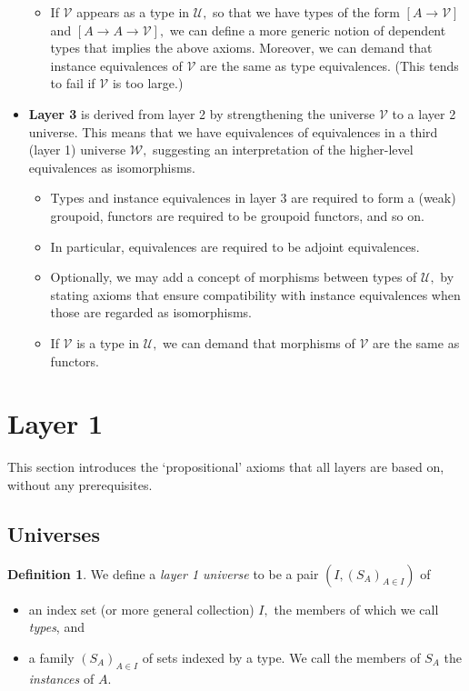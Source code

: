 \documentclass[a4paper]{article}
\theoremstyle{definition}
\newtheorem{definition}{Definition}[section]
\theoremstyle{remark}
\newcommand{\defn}{\emph}
\newcommand{\U}{\mathcal{U}}
\newcommand{\V}{\mathcal{V}}
\newcommand{\W}{\mathcal{W}}
\begin{document}
\begin{itemize}
\begin{itemize}
    \item If $\V$ appears as a type in $\U,$ so that we have types of the form $[A \to \V]$ and
    $[A \to A \to \V],$ we can define a more generic notion of dependent types that implies the
    above axioms. Moreover, we can demand that instance equivalences of $\V$ are the same as type
    equivalences. (This tends to fail if $\V$ is too large.)
  \end{itemize}
  \item \textbf{Layer 3} is derived from layer 2 by strengthening the universe $\V$ to a layer 2
  universe. This means that we have equivalences of equivalences in a third (layer 1) universe $\W,$
  suggesting an interpretation of the higher-level equivalences as isomorphisms.
  \begin{itemize}
    \item Types and instance equivalences in layer 3 are required to form a (weak) groupoid,
    functors are required to be groupoid functors, and so on.
    \item In particular, equivalences are required to be adjoint equivalences.
    \item Optionally, we may add a concept of morphisms between types of $\U,$ by stating axioms
    that ensure compatibility with instance equivalences when those are regarded as isomorphisms.
    \item If $\V$ is a type in $\U,$ we can demand that morphisms of $\V$ are the same as functors.
  \end{itemize}
\end{itemize}

\section{Layer 1}

This section introduces the `propositional' axioms that all layers are based on, without any
prerequisites.

\subsection{Universes}
\label{sec:layer1-universes}

\begin{definition}
  \label{def:layer1-universe}
  We define a \defn{layer 1 universe} to be a pair $(I, (S_A)_{A \in I})$ of
  \begin{itemize}
    \item an index set (or more general collection) $I,$ the members of which we call \defn{types},
    and
    \item a family $(S_A)_{A \in I}$ of sets indexed by a type. We call the members of $S_A$ the
    \defn{instances} of $A.$
  \end{itemize}
\end{definition}
\end{document}
